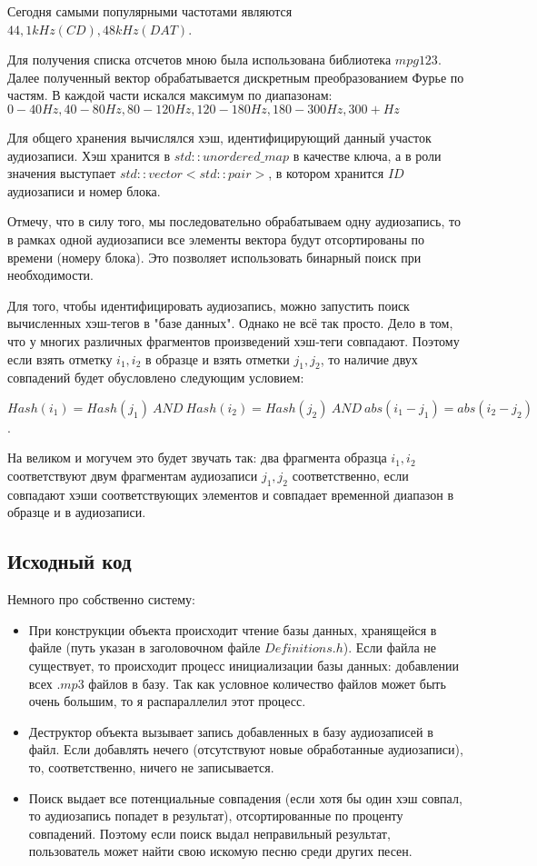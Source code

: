 \documentclass[12pt]{article}
\begin{document}
	Сегодня самыми популярными частотами являются $ 44,1 kHz (CD),  48 kHz (DAT)$.
	
	Для получения списка отсчетов мною была использована библиотека $mpg123$. Далее полученный вектор обрабатывается дискретным преобразованием Фурье по частям. В каждой части искался максимум по диапазонам: $0 - 40 Hz, 40 - 80 Hz, 80 - 120 Hz, 120 - 180 Hz, 180 - 300 Hz, 300+ Hz$
	
	Для общего хранения вычислялся хэш, идентифицирующий данный участок аудиозаписи. Хэш хранится в $std::unordered\_map$ в качестве ключа, а в роли значения выступает $std::vector<std::pair>$, в котором хранится $ID$ аудиозаписи и номер блока.
	
	Отмечу, что в силу того, мы последовательно обрабатываем одну аудиозапись, то в рамках одной аудиозаписи все элементы вектора будут отсортированы по времени (номеру блока). Это позволяет использовать бинарный поиск при необходимости.
	
	Для того, чтобы идентифицировать аудиозапись, можно запустить поиск вычисленных хэш-тегов в "базе данных". Однако не всё так просто. Дело в том, что у многих различных фрагментов произведений хэш-теги совпадают. Поэтому если взять отметку $i_1, i_2$ в образце и взять отметки $j_1, j_2$, то наличие двух совпадений будет обусловлено следующим условием:
	
	$Hash(i_1) = Hash(j_1) \: AND \: Hash(i_2) = Hash(j_2)\:AND\:abs(i_1 - j_1) = abs(i_2 - j_2)$.
	
	На великом и могучем это будет звучать так: два фрагмента образца $i_1, i_2$ соответствуют двум фрагментам аудиозаписи $j_1, j_2$ соответственно, если совпадают хэши соответствующих элементов и совпадает временной диапазон в образце и в аудиозаписи.
	
	\subsection*{Исходный код}
	Немного про собственно систему:
	\begin{itemize}
		\item При конструкции объекта происходит чтение базы данных, хранящейся в файле (путь указан в заголовочном файле $Definitions.h$). Если файла не существует, то происходит процесс инициализации базы данных: добавлении всех $.mp3$ файлов в базу. Так как условное количество файлов может быть очень большим, то я распараллелил этот процесс.
		\item Деструктор объекта вызывает запись добавленных в базу аудиозаписей в файл. Если добавлять нечего (отсутствуют новые обработанные аудиозаписи), то, соответственно, ничего не записывается.
		\item Поиск выдает все потенциальные совпадения (если хотя бы один хэш совпал, то аудиозапись попадет в результат), отсортированные по проценту совпадений. Поэтому если поиск выдал неправильный результат, пользователь может найти свою искомую песню среди других песен.
	\end{itemize}	
\noindent\makebox[\linewidth]{\rule{\paperwidth}{0.4pt}}
\inputminted[breaklines]{C++}{../src/Definitions.h}
\vspace{5mm}
\end{document}
